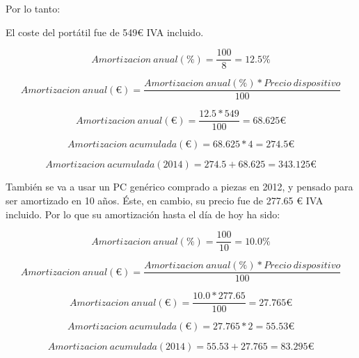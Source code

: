Por lo tanto:

El coste del port\'atil fue de 549€ IVA incluido.
\begin{center}
\begin{equation}
Amortizacion \ anual (\%) = \frac{100}{8} = 12.5 \%
\end{equation}

\begin{equation}
Amortizacion \ anual (€) = \frac{Amortizacion \ anual(\%) * Precio \ dispositivo}{100}
\end{equation}

\begin{equation}
Amortizacion \ anual (€) = \frac{12.5 * 549}{100} = 68.625 €
\end{equation}

\begin{equation}
Amortizacion \ acumulada (€) = 68.625 * 4 = 274.5 €
\end{equation}

\begin{equation}
Amortizacion \ acumulada (2014) = 274.5 + 68.625 = 343.125 €
\end{equation}

\end{center}

Tambi\'{e}n se va a usar un PC gen\'{e}rico comprado a piezas en 2012, y pensado para
ser amortizado en 10 a\~nos. \'Este, en cambio, su precio fue de 277.65 € IVA incluido.
Por lo que su amortizaci\'on hasta el d\'ia de hoy ha sido:

\begin{center}
\begin{equation}
Amortizacion \ anual (\%) = \frac{100}{10} = 10.0 \%
\end{equation}

\begin{equation}
Amortizacion \ anual (€) = \frac{Amortizacion \ anual(\%) * Precio \ dispositivo}{100}
\end{equation}

\begin{equation}
Amortizacion \ anual (€) = \frac{10.0 * 277.65}{100} = 27.765 €
\end{equation}

\begin{equation}
Amortizacion \ acumulada (€) = 27.765 * 2 = 55.53 €
\end{equation}

\begin{equation}
Amortizacion \ acumulada (2014) = 55.53 + 27.765 = 83.295 €
\end{equation}

\end{center}

